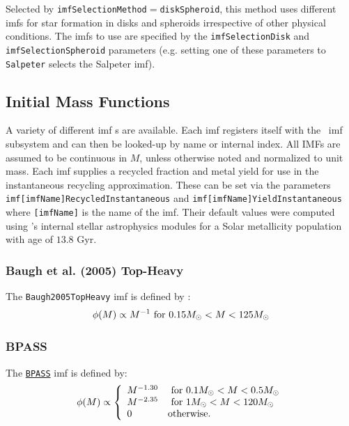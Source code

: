 Selected by {\tt imfSelectionMethod}$=${\tt diskSpheroid}, this method uses different {\gls{imf}}s for star formation in disks and spheroids irrespective of other physical conditions. The {\gls{imf}}s to use are specified by the {\tt imfSelectionDisk} and {\tt imfSelectionSpheroid} parameters (e.g. setting one of these parameters to {\tt Salpeter} selects the Salpeter \gls{imf}).

\subsection{Initial Mass Functions}\label{sec:physicsIMF}

A variety of different \gls{imf} s are available. Each \gls{imf} registers itself with the \glc\ \gls{imf} subsystem and can then be looked-up by name or internal index. All IMFs are assumed to be continuous in $M$, unless otherwise noted and normalized to unit mass. Each \gls{imf} supplies a recycled fraction and metal yield for use in the instantaneous recycling approximation. These can be set via the parameters {\tt imf[imfName]RecycledInstantaneous} and {\tt imf[imfName]YieldInstantaneous} where {\tt [imfName]} is the name of the \gls{imf}. Their default values were computed using \glc 's internal stellar astrophysics modules for a Solar metallicity population with age of $13.8$ Gyr.

\subsubsection{Baugh et al. (2005) Top-Heavy}

The {\tt Baugh2005TopHeavy} \gls{imf} is defined by \citep{baugh_can_2005}:
\begin{equation}
 \phi(M) \propto 
 M^{-1} \hbox{ for } 0.15M_\odot < M < 125M_\odot
\end{equation}

\subsubsection{BPASS}

The \href{http://www.bpass.org.uk/}{\tt BPASS} \gls{imf} is defined by:
\begin{equation}
 \phi(M) \propto \left\{ \begin{array}{ll}
 M^{-1.30} & \hbox{ for } 0.1M_\odot < M < 0.5M_\odot \\ 
 M^{-2.35} & \hbox{ for } 1M_\odot < M < 120M_\odot \\ 
0 & \hbox {otherwise.} \end{array} \right.
\end{equation}

